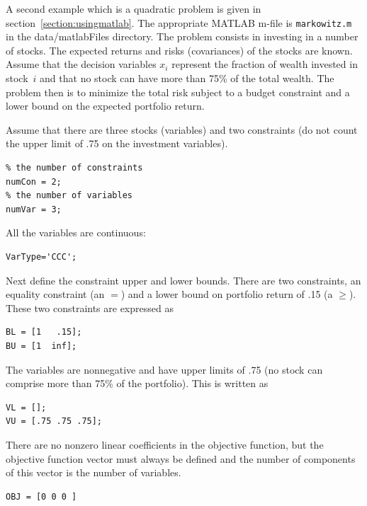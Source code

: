 \documentclass[11pt]{article}
\renewcommand{\_}{{\char"5F}}
\renewcommand{\{}{{\char"7B}}
\renewcommand{\}}{{\char"7D}}
\renewcommand{\^}{{\char"0D}}
\renewcommand{\'}{{\char"0D}}
\begin{document}
\begin{enumerate}[Step 1:]
 A second example which is a quadratic problem is given in section~\ref{section:usingmatlab}. 
The appropriate MATLAB m-file is {\tt markowitz.m} in the {data/matlabFiles} directory.
The problem consists in investing  in a number of stocks. The expected returns and risks
(covariances) of the stocks are known. Assume that the decision variables $x_i$
represent the fraction of wealth invested in stock~$i$ and that no stock can have
more than 75\% of the total wealth. The problem then is to minimize the total risk
subject to a budget constraint and a lower bound on the expected portfolio return.

Assume that there are three stocks (variables) and two constraints (do not count the upper limit  %
of .75 on the investment variables).


\begin{verbatim}
% the number of constraints
numCon = 2;
% the number of variables
numVar = 3;
\end{verbatim}



All the variables are continuous:


\begin{verbatim}
VarType='CCC';
\end{verbatim}


Next define the constraint upper and lower bounds. There are two constraints, an equality  constraint (an $=$) and a lower bound on portfolio return of .15 (a $\ge$). These two constraints are expressed as



\begin{verbatim}
BL = [1   .15];
BU = [1  inf];
\end{verbatim}



The variables are nonnegative and have upper limits of .75 (no stock can comprise more than 75\% of the portfolio).  This is written as




\begin{verbatim}
VL = [];
VU = [.75 .75 .75];
\end{verbatim}



There are no nonzero linear coefficients in the objective function, but the objective function vector must always be defined and the number of components of this vector is the number of variables.



\begin{verbatim}
OBJ = [0 0 0 ]
\end{verbatim}



\end{enumerate}
\end{document}
